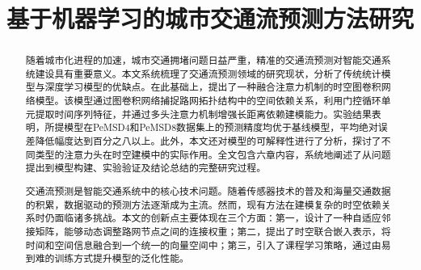 \documentclass[12pt,a4paper,twoside]{ctexbook}
\title{基于机器学习的城市交通流预测方法研究}
\begin{document}
\begin{abstract}
随着城市化进程的加速，城市交通拥堵问题日益严重，精准的交通流预测对智能交通系统建设具有重要意义。本文系统梳理了交通流预测领域的研究现状，分析了传统统计模型与深度学习模型的优缺点。在此基础上，提出了一种融合注意力机制的时空图卷积网络模型。该模型通过图卷积网络捕捉路网拓扑结构中的空间依赖关系，利用门控循环单元提取时间序列特征，并通过多头注意力机制增强长距离依赖建模能力。实验结果表明，所提模型在PeMSD4和PeMSD8数据集上的预测精度均优于基线模型，平均绝对误差降低幅度达到百分之八以上。此外，本文还对模型的可解释性进行了分析，探讨了不同类型的注意力头在时空建模中的实际作用。全文包含六章内容，系统地阐述了从问题提出到模型构建、实验验证及结论总结的完整研究过程。

交通流预测是智能交通系统中的核心技术问题。随着传感器技术的普及和海量交通数据的积累，数据驱动的预测方法逐渐成为主流。然而，现有方法在建模复杂的时空依赖关系时仍面临诸多挑战。本文的创新点主要体现在三个方面：第一，设计了一种自适应邻接矩阵，能够动态调整路网节点之间的连接权重；第二，提出了时空联合嵌入表示，将时间和空间信息融合到一个统一的向量空间中；第三，引入了课程学习策略，通过由易到难的训练方式提升模型的泛化性能。
\end{abstract}

\end{document}
